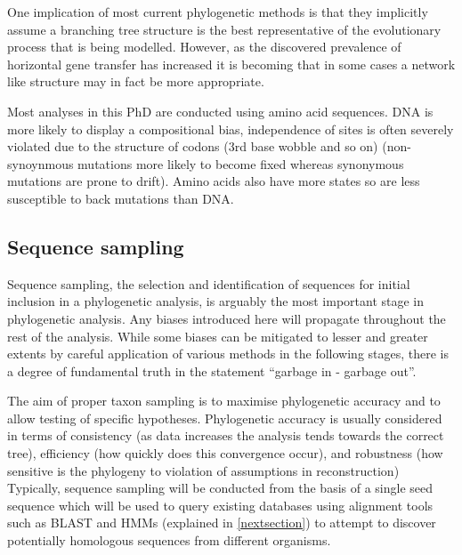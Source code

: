 %
%
%
%
%
%
%
%
%
%
%




One implication of most current phylogenetic methods is that they implicitly
assume a branching tree structure is the best representative of the evolutionary
process that is being modelled.  However, as the discovered prevalence of
horizontal gene transfer has increased it is becoming that in some cases
a network like structure may in fact be more appropriate.


Most analyses in this PhD are conducted using amino acid sequences.  
DNA is more likely to display a compositional bias, independence of sites
is often severely violated due to the structure of codons (3rd base wobble and so on)
(non-synoynmous mutations more likely to become fixed whereas synonymous mutations are
prone to drift).  Amino acids also have more states so are less susceptible to back mutations
than DNA.  


\subsection{Sequence sampling}
Sequence sampling, the selection and identification of sequences for initial inclusion in a 
phylogenetic analysis, is arguably the most important stage in phylogenetic analysis.
Any biases introduced here will propagate throughout the rest of the analysis. 
While some biases can be mitigated to lesser and greater extents 
by careful application of various methods in the following
stages, there is a degree of fundamental truth in the statement ``garbage in - garbage out''.

The aim of proper taxon sampling is to maximise phylogenetic accuracy and to allow
testing of specific hypotheses. 
Phylogenetic accuracy is usually considered in terms of consistency (as data increases 
    the analysis tends towards the correct tree), efficiency (how quickly does this convergence
occur), and robustness (how sensitive is the phylogeny to violation of assumptions in reconstruction) \citep{Nabhan2012}
Typically, sequence sampling will be conducted from the basis of a single
seed sequence which will be used to query existing databases using alignment 
tools such as BLAST and HMMs (explained in \ref{nextsection}) to attempt to discover
potentially homologous sequences from different organisms.  


